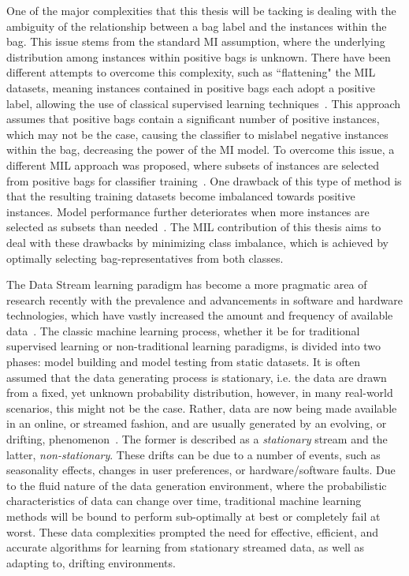 \documentclass[reqno]{vcuthesis}
\numberwithin{equation}{chapter}
\begin{document}
One of the major complexities that this thesis will be tacking is dealing with the ambiguity of the relationship between a bag label and the instances within the bag. This issue stems from the standard MI assumption, where the underlying distribution among instances within positive bags is unknown. There have been different attempts to overcome this complexity, such as ``flattening" the MIL datasets, meaning instances contained in positive bags each adopt a positive label, allowing the use of classical supervised learning techniques~\cite{Ray2005}. This approach assumes that positive bags contain a significant number of positive instances, which may not be the case, causing the classifier to mislabel negative instances within the bag, decreasing the power of the MI model. To overcome this issue, a different MIL approach was proposed, where subsets of instances are selected from positive bags for classifier training~\cite{Maron1998}. One drawback of this type of method is that the resulting training datasets become imbalanced towards positive instances. Model performance further deteriorates when more instances are selected as subsets than needed~\cite{Carbonneau2016}. The MIL contribution of this thesis aims to deal with these drawbacks by minimizing class imbalance, which is achieved by optimally selecting bag-representatives from both classes.

The Data Stream learning paradigm has become a more pragmatic area of research recently with the prevalence and advancements in software and hardware technologies, which have vastly increased the amount and frequency of available data~\cite{gaber2005mining}. The classic machine learning process, whether it be for traditional supervised learning or non-traditional learning paradigms, is divided into two phases: model building and model testing from static datasets. It is often assumed that the data generating process is stationary, i.e. the data are drawn from a fixed, yet unknown probability distribution, however, in many real-world scenarios, this might not be the case. Rather, data are now being made available in an online, or streamed fashion, and are usually generated by an evolving, or drifting, phenomenon~\cite{national2013frontiers,ditzler2015learning,zhou2014big}. The former is described as a \textit{stationary} stream and the latter, \textit{non-stationary}. These drifts can be due to a number of events, such as seasonality effects, changes in user preferences, or hardware/software faults. Due to the fluid nature of the data generation environment, where the probabilistic characteristics of data can change over time, traditional machine learning methods will be bound to perform sub-optimally at best or completely fail at worst. These data complexities prompted the need for effective, efficient, and accurate algorithms for learning from stationary streamed data, as well as adapting to, drifting environments. 
\end{document}
